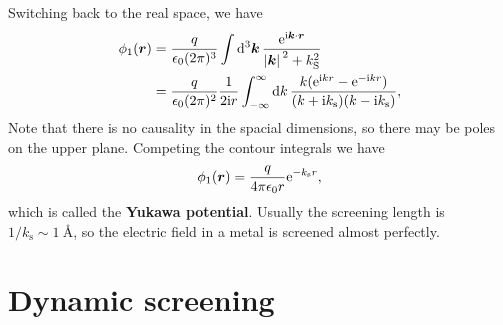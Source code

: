 \documentclass[hyperref, a4paper]{article}
\newcommand*{\ii}{\mathrm{i}}
\newcommand*{\ee}{\mathrm{e}}
\newcommand*{\concept}[1]{{\textbf{#1}}}
\begin{document}
Switching back to the real space, we have 
\[
    \begin{aligned}
        \phi_1(\vb*{r}) &= \frac{q}{\epsilon_0 (2\pi)^3} \int \dd[3]{\vb*{k}} \frac{\ee^{\ii \vb*{k} \cdot \vb*{r}}}{\abs*{\vb*{k}}^2 + k_\text{S}^2} \\
        &= \frac{q}{\epsilon_0 (2\pi)^2} \frac{1}{2 \ii r} \int_{-\infty}^\infty \dd{k} \frac{k (\ee^{\ii k r} - \ee^{- \ii k r})}{(k + \ii k_\text{s}) (k - \ii k_\text{s})} ,
    \end{aligned}
\]
Note that there is no causality in the spacial dimensions, so there may be poles on the upper plane.
Competing the contour integrals we have 
\begin{equation}
    \phi_1(\vb*{r}) = \frac{q}{4\pi \epsilon_0 r} \ee^{- k_\text{s} r},
\end{equation}
which is called the \concept{Yukawa potential}. Usually the screening length is $1 / k_\text{s} \sim \SI{1}{\angstrom}$, so the electric field in a metal is screened almost perfectly.

\section{Dynamic screening}
\end{document}
